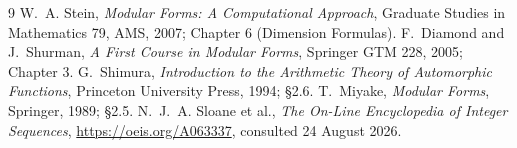\documentclass[11pt,a4paper]{article}
\theoremstyle{plain}
\theoremstyle{definition}
\begin{document}
\begin{thebibliography}{9}
 W.~A. Stein, \emph{Modular Forms: A Computational Approach}, Graduate
Studies in Mathematics 79, AMS, 2007; Chapter 6 (Dimension Formulas).
 F.~Diamond and J.~Shurman, \emph{A First Course in Modular Forms}, Springer
GTM 228, 2005; Chapter 3.
 G.~Shimura, \emph{Introduction to the Arithmetic Theory of Automorphic
Functions}, Princeton University Press, 1994; \S2.6.
 T.~Miyake, \emph{Modular Forms}, Springer, 1989; \S2.5.
 N.~J.~A. Sloane et al., \emph{The On-Line Encyclopedia of Integer
Sequences}, \url{https://oeis.org/A063337}, consulted 24 August 2026.
\end{thebibliography}
\end{document}

